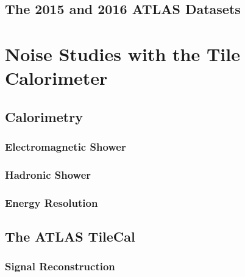 \documentclass[10pt,twoside,cucitura,classica,openany]{toptesi}
\begin{document}


\section{The 2015 and 2016 ATLAS Datasets}
\label{sec:atlas-datasets}



\chapter{Noise Studies with the Tile Calorimeter}
\label{cha:noise-studies-with}

\section{Calorimetry}
\label{sec:calorimetry}



\subsection{Electromagnetic Shower}
\label{sec:electr-show}



\subsection{Hadronic Shower}
\label{sec:hadronic-shower}



\subsection{Energy Resolution}
\label{sec:energy-resolution}



\section{The ATLAS TileCal}
\label{sec:atlas-tilecal}



\subsection{Signal Reconstruction}
\label{sec:sign-reconstr}
\end{document}

